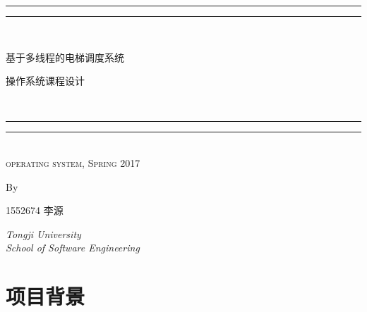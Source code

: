 \documentclass{article}
\begin{document}
 
\begin{CJK}{UTF8}{gbsn}

\newcommand*{\titleGP}{\begingroup %
\centering %
\vspace*{\baselineskip} %

\rule{\textwidth}{1.6pt}\vspace*{-\baselineskip}\vspace*{2pt} %
\rule{\textwidth}{0.4pt}\\[\baselineskip] %

{\LARGE 基于多线程的电梯调度系统 \\ \vspace{2em} \begin{large} 操作系统课程设计 \end{large}}\\[0.2\baselineskip] %

\rule{\textwidth}{0.4pt}\vspace*{-\baselineskip}\vspace{3.2pt} %
\rule{\textwidth}{1.6pt}\\[\baselineskip] %

\scshape %
operating system,  Spring 2017\par %

\vspace*{2\baselineskip} %

 By \\[\baselineskip]
{\Large1552674 李源 \par} %


\vfill %

{\itshape Tongji University \\ School of Software Engineering \par}

\endgroup}


\titleGP %
\clearpage
\tableofcontents
\clearpage

\section{项目背景}

\end{CJK}
\end{document}
